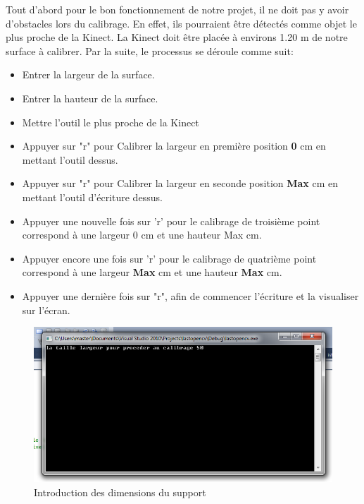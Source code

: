\documentclass[12pt,a4paper,oneside]{book}
\begin{document}
	Tout d'abord  pour le bon fonctionnement de notre projet, il ne doit pas y avoir d'obstacles lors du calibrage. En effet, ils pourraient être détectés comme objet le plus proche de la Kinect. La Kinect doit être placée à environs 1.20 m de notre surface à calibrer. Par la suite, le processus se déroule comme suit:
	
	\begin{itemize}
		\item Entrer la largeur de la surface.
		\item Entrer la hauteur de la surface.
		
		\item Mettre l'outil le plus proche de la  Kinect 
		\item Appuyer sur "r" pour Calibrer la largeur en première position \textbf{0} cm en mettant l'outil dessus.
		\item Appuyer sur "r" pour Calibrer la largeur en seconde position \textbf{Max} cm en mettant l'outil d'écriture dessus.
		\item Appuyer une nouvelle fois sur 'r' pour le calibrage de troisième point correspond à une largeur 0 cm et une hauteur Max cm.
		\item Appuyer encore une  fois sur 'r' pour le calibrage de quatrième  point correspond à une largeur \textbf{Max } cm et une hauteur \textbf{Max} cm.		
		\item Appuyer une dernière fois sur "r", afin de commencer l'écriture et la visualiser sur l'écran.
	\end{itemize}
	
	\begin{figure}[H]
		
		\centering
		\includegraphics[scale=0.7]{images/it1.png}
		\caption{Introduction des dimensions du support}
		\label{fig8}
	\end{figure}
	
\end{document}
